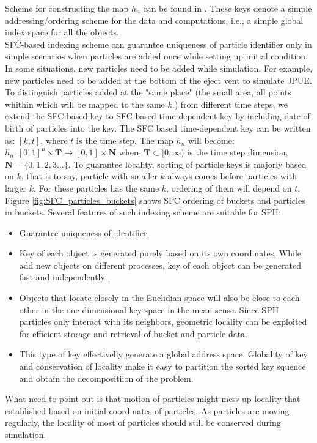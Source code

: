 \documentclass[10pt,a4paper]{article}
\begin{document}
Scheme for constructing the map $h_n$ can be found in \citep{patra1995problem}. These keys denote a simple addressing/ordering scheme for the data and computations, i.e., a simple global index space for all the objects.\\
SFC-based indexing scheme can guarantee uniqueness of particle identifier only in simple scenarios when particles are added once while setting up initial condition. In some situations, new particles need to be added while simulation. For example, new particles need to be added at the bottom of the eject vent to simulate JPUE. To distinguish particles added at the "same place" (the small area, all points whithin which will be mapped to the same $k$.) from different time steps, we extend the SFC-based key to SFC based time-dependent key by including date of birth of particles into the key. The SFC based time-dependent key can be written as: $[k,t]$, where $t$ is the time step. The map $h_n$  will become: 
$h_n: [0,1]^n \times \textbf{T} \rightarrow [0,1] \times \textbf{N}$
where $\textbf{T} \subset [0,\infty)$ is the time step dimension, $\textbf{N}=\lbrace 0, 1, 2, 3...\rbrace$.
To guarantee locality, sorting of particle keys is majorly based on $k$, that is to say, particle with smaller $k$ always comes before particles with larger $k$. For these particles has the same $k$, ordering of them will depend on $t$. Figure \ref{fig:SFC_particles_buckets} shows SFC ordering of buckets and particles in buckets. 
Several features of such indexing scheme are suitable for SPH:
\begin{itemize}
\item Guarantee uniqueness of identifier.
\item Key of each object is generated purely based on its own coordinates. While add new objects on different processes, key of each object can be generated fast and independently .
\item Objects that locate closely in the Euclidian space will also be close to each other in the one dimensional key space in the mean sense. Since SPH particles only interact with its neighbors, geometric locality can be exploited for efficient storage and retrieval of bucket and particle data.
\item This type of key effectivelly generate a global address space. Globality of key and conservation of locality make it easy to partition the sorted key squence and obtain the decompositiion of the problem.
\end{itemize}
What need to point out is that motion of particles might mess up locality that established based on initial coordinates of particles. As particles are moving regularly, the locality of most of particles should still be conserved during simulation.
\end{document}
